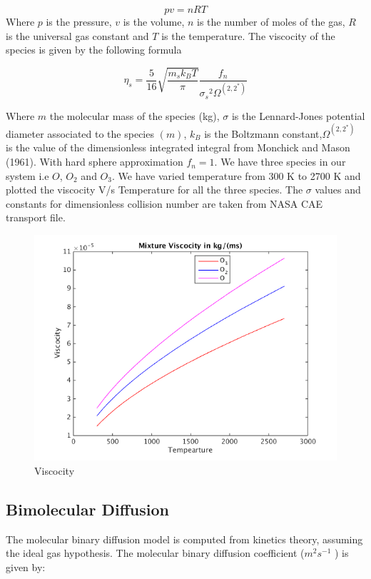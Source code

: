 $$pv = nRT$$ Where $p$ is the pressure, $v$ is the volume, $n$ is the number of moles of the gas, $R$ is the universal gas constant and $T$ is the temperature. The viscocity of the species is given by the following formula

$$\eta_s = \frac{5}{16}\sqrt{\frac{m_s k_B T}{\pi}}\frac{f_n}{{\sigma_s}^2   \Omega^{(2,2^*)}}$$

\noindent Where  $m$ the molecular mass of the species (kg), $\sigma$ is the Lennard-Jones potential diameter associated
to the species $(m)$, $k_B$ is the Boltzmann constant,$\Omega^{(2,2^*)}$ is the value of the dimensionless integrated integral from Monchick
and Mason (1961). With hard sphere approximation $f_n = 1$. We have three species in our system i.e $O$, $O_2$ and $O_3$. We have varied temperature from 300 K to 2700 K and plotted the viscocity V/s Temperature for all the three species. The $\sigma$ values and constants for dimensionless collision number are taken from NASA CAE transport file. 
\begin{figure}[H]
  \centering
  \includegraphics[scale=0.5]{figs/viscocity model.png}
   \caption{Viscocity}
\end{figure}

\subsection{Bimolecular Diffusion}
\noindent The molecular binary diffusion model is
computed from kinetics theory, assuming the ideal gas hypothesis. The molecular binary diffusion coefficient ($m^2 s^{-1}$ ) is given by:

